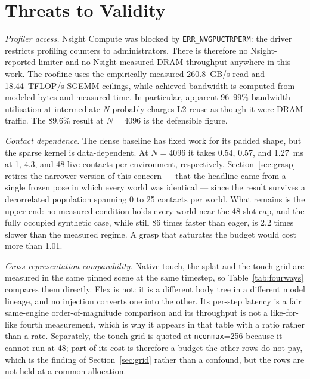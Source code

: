 \documentclass[journal]{IEEEtran}
\begin{document}
\section{Threats to Validity}
\label{sec:threats}

\textit{Profiler access.} Nsight Compute was blocked by \texttt{ERR\_NVGPUCTRPERM}: the driver restricts profiling counters to administrators. There is therefore no Nsight-reported limiter and no Nsight-measured DRAM throughput anywhere in this work. The roofline uses the empirically measured 260.8~GB/s read and 18.44~TFLOP/s SGEMM ceilings, while achieved bandwidth is computed from modeled bytes and measured time. In particular, apparent 96--99\% bandwidth utilisation at intermediate $N$ probably charges L2 reuse as though it were DRAM traffic. The 89.6\% result at $N=4096$ is the defensible figure.

\textit{Contact dependence.} The dense baseline has fixed work for its padded shape, but the sparse kernel is data-dependent. At $N=4096$ it takes 0.54, 0.57, and 1.27~ms at 1, 4.3, and 48 live contacts per environment, respectively. Section~\ref{sec:grasp} retires the narrower version of this concern --- that the headline came from a single frozen pose in which every world was identical --- since the result survives a decorrelated population spanning 0 to 25 contacts per world. What remains is the upper end: no measured condition holds every world near the 48-slot cap, and the fully occupied synthetic case, while still 86 times faster than eager, is 2.2 times slower than the measured regime. A grasp that saturates the budget would cost more than 1.01.

\textit{Cross-representation comparability.} Native touch, the splat and the touch grid are measured in the same pinned scene at the same timestep, so Table~\ref{tab:fourways} compares them directly. Flex is not: it is a different body tree in a different model lineage, and no injection converts one into the other. Its per-step latency is a fair same-engine order-of-magnitude comparison and its throughput is not a like-for-like fourth measurement, which is why it appears in that table with a ratio rather than a rate. Separately, the touch grid is quoted at \texttt{nconmax}=256 because it cannot run at 48; part of its cost is therefore a budget the other rows do not pay, which is the finding of Section~\ref{sec:grid} rather than a confound, but the rows are not held at a common allocation.
\end{document}
